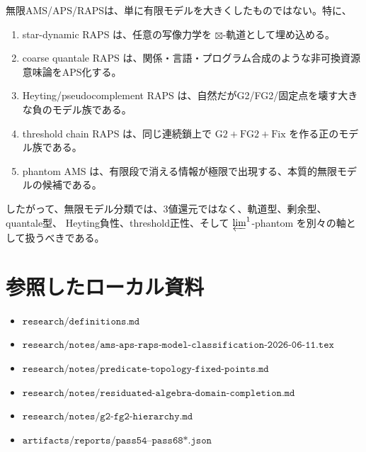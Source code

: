\documentclass[uplatex,dvipdfmx,a4paper,10pt]{jsarticle}
\newcommand{\Gtwo}{\mathrm{G2}}
\newcommand{\FGtwo}{\mathrm{FG2}}
\newcommand{\Fix}{\mathrm{Fix}}
\newcommand{\bt}{\boxtimes}
\begin{document}
無限AMS/APS/RAPSは、単に有限モデルを大きくしたものではない。特に、
\begin{enumerate}
  \item star-dynamic RAPS は、任意の写像力学を \(\bt\)-軌道として埋め込める。
  \item coarse quantale RAPS は、関係・言語・プログラム合成のような非可換資源意味論をAPS化する。
  \item Heyting/pseudocomplement RAPS は、自然だがG2/FG2/固定点を壊す大きな負のモデル族である。
  \item threshold chain RAPS は、同じ連続鎖上で \(\Gtwo+\FGtwo+\Fix\) を作る正のモデル族である。
  \item phantom AMS は、有限段で消える情報が極限で出現する、本質的無限モデルの候補である。
\end{enumerate}
したがって、無限モデル分類では、3値還元ではなく、軌道型、剰余型、quantale型、
Heyting負性、threshold正性、そして \(\varprojlim^1\)-phantom を別々の軸として扱うべきである。

\section*{参照したローカル資料}
\begin{itemize}
  \item \(\texttt{research/definitions.md}\)
  \item \(\texttt{research/notes/ams-aps-raps-model-classification-2026-06-11.tex}\)
  \item \(\texttt{research/notes/predicate-topology-fixed-points.md}\)
  \item \(\texttt{research/notes/residuated-algebra-domain-completion.md}\)
  \item \(\texttt{research/notes/g2-fg2-hierarchy.md}\)
  \item \(\texttt{artifacts/reports/pass54--pass68*.json}\)
\end{itemize}
\end{document}
